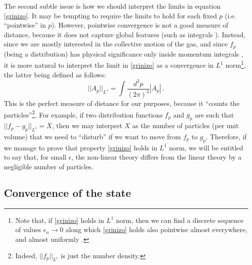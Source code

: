 \documentclass[a4paper, amsfonts, amssymb, amsmath, reprint, showkeys, nofootinbib, twoside, onecolumn,notitlepage,,longbibliography]{revtex4-2}
\theoremstyle{definition}
\theoremstyle{theorem}
\theoremstyle{corollary}
\begin{document}
The second subtle issue is how we should interpret the limits in equation \eqref{grinizo}. It may be tempting to require the limits to hold for each fixed $p$ (i.e. ``pointwise'' in $p$). However, pointwise convergence is not a good measure of distance, because it does not capture global features (such as integrals \cite[Ch 7, Example 7.6]{RudinAnalysis_book}). Instead, since we are mostly interested in the collective motion of the gas, and since $f_p$ (being a distribution) has physical significance only inside momentum integrals \cite[\S I.1]{Groot1980RelativisticKT}, it is more natural to interpret the limit in \eqref{grinizo} as a convergence in $L^1$ norm\footnote{Note that, if \eqref{grinizo} holds in $L^1$ norm, then we can find a discrete sequence of values $\epsilon_n \rightarrow 0$ along which \eqref{grinizo} holds also pointwise almost everywhere, and almost uniformly \cite[Corollary 1.5.10]{TaoMeasureTheory2011}.}, the latter being defined as follows:
\begin{equation}
||A_p||_{L^1} =\int \dfrac{d^3 p}{(2\pi)^3}  |A_p| \,  .
\end{equation}
This is the perfect measure of distance for our purposes, because it ``counts the particles''\footnote{Indeed, $||f_p||_{L^1}$ is just the number density.}. For example, if two distribution functions $f_p$ and $g_p$ are such that $|| f_p-g_p||_{L^1}=X$, then we may interpret $X$ as the number of particles (per unit volume) that we need to ``disturb'' if we want to move from $f_p$ to $g_p$. Therefore, if we manage to prove that property \eqref{grinizo} holds in $L^1$ norm, we will be entitled to say that, for small $\epsilon$, the non-linear theory differs from the linear theory by a negligible number of particles.


\subsection{Convergence of the state}
\vspace{-0.2cm}
\end{document}
